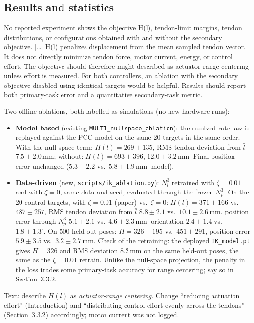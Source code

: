 \documentclass[10pt,a4paper]{article}
\begin{document}
\subsection{Results and statistics}\label{sec:results}
\begin{rev} No reported experiment shows the objective H(l), tendon-limit margins, tendon distributions, or configurations obtained with and without the secondary objective. [\dots] H(l) penalizes displacement from the mean sampled tendon vector. It does not directly minimize tendon force, motor current, energy, or control effort. The objective should therefore might described as actuator-range centering unless effort is measured. For both controllers, an ablation with the secondary objective disabled using identical targets would be helpful. Results should report both primary-task error and a quantitative secondary-task metric.
\end{rev}
\begin{todo}
Two offline ablations, both labelled as simulations (no new hardware runs):
\begin{itemize}
\item \textbf{Model-based} (existing \texttt{MULTI\_nullspace\_ablation}): the resolved-rate law is replayed against the PCC model on the same 20 targets in the same order. With the null-space term: $H(l)=269\pm135$, RMS tendon deviation from $\bar l$ $7.5\pm2.0$\,mm; without: $H(l)=693\pm396$, $12.0\pm3.2$\,mm. Final position error unchanged ($5.3\pm2.2$ vs.\ $5.8\pm1.9$\,mm, model).
\item \textbf{Data-driven} (new, \texttt{scripts/ik\_ablation.py}): $N_l^3$ retrained with $\zeta=0.01$ and with $\zeta=0$, same data and seed, evaluated through the frozen $N_p^3$. On the 20 control targets, with $\zeta=0.01$ (paper) vs.\ $\zeta=0$: $H(l)=371\pm166$ vs.\ $487\pm257$, RMS tendon deviation from $\bar l$ $8.8\pm2.1$ vs.\ $10.1\pm2.6$\,mm, position error through $N_p^3$ $5.1\pm2.1$ vs.\ $4.6\pm2.3$\,mm, orientation $2.4\pm1.4$ vs.\ $1.8\pm1.3^\circ$. On 500 held-out poses: $H=326\pm195$ vs.\ $451\pm291$, position error $5.9\pm3.5$ vs.\ $3.2\pm2.7$\,mm. Check of the retraining: the deployed \texttt{IK\_model.pt} gives $H=326$ and RMS deviation 8.2\,mm on the same held-out poses, the same as the $\zeta=0.01$ retrain. Unlike the null-space projection, the penalty in the loss trades some primary-task accuracy for range centering; say so in Section~3.3.2.
\end{itemize}
Text: describe $H(l)$ as \emph{actuator-range centering}. Change ``reducing actuation effort'' (Introduction) and ``distributing control effort evenly across the tendons'' (Section~3.3.2) accordingly; motor current was not logged.
\end{todo}
\end{document}
